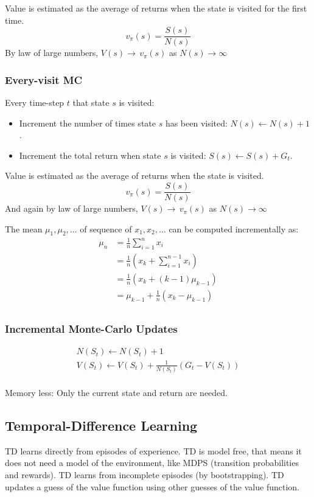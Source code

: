 Value is estimated as the average of returns when the state is visited for the first time.
\[
    v_{\pi}(s) = \frac{S(s)}{N(s)}
\]
By law of large numbers, $V(s)\rightarrow\,v_{\pi}(s)$ as $N(s)\rightarrow\infty$

\subsubsection{Every-visit MC}\label{subsubsec:every-visit-mc}
Every time-step $t$ that state $s$ is visited:
\begin{itemize}
    \item Increment the number of times state $s$ has
    been visited: $N(s) \leftarrow N(s) + 1$.
    \item Increment the total return when
    state $s$ is visited: $S(s) \leftarrow S(s) + G_t$.
\end{itemize}
Value is estimated as the average of returns when the state is visited.
\[
    v_{\pi}(s) = \frac{S(s)}{N(s)}
\]
And again by law of large numbers,
$V(s)\rightarrow\,v_{\pi}(s)$ as $N(s)\rightarrow\infty$

The mean $\mu_1, \mu_2, \ldots$ of sequence of $x_1, x_2, \ldots$ can be computed
incrementally as:
\begin{align}
    \mu_n &= \frac{1}{n}\sum_{i=1}^{n}x_i \\
    &= \frac{1}{n}\left(x_k + \sum_{i=1}^{n-1}x_i\right) \\
    &= \frac{1}{n}\left(x_k + (k-1)\mu_{k-1}\right) \\
    &= \mu_{k-1} + \frac{1}{n}\left(x_k-\mu_{k-1}\right) \\
\end{align}

\subsubsection{Incremental Monte-Carlo Updates}\label{subsubsec:incremental-monte-carlo-updates}
\begin{gather*}
    N(S_t) \leftarrow N(S_t) + 1\\
    V(S_t) \leftarrow V(S_t) + \frac{1}{N(S_t)}\left(G_t - V(S_t)\right)\\
\end{gather*}

Memory less: Only the current state and return are needed.

\subsection{Temporal-Difference Learning}\label{subsec:temporal-difference-learning}
TD learns directly from episodes of experience.
TD is model free, that means it does not need a model of the environment,
like MDPS (transition probabilities and rewards).
TD learns from incomplete episodes (by bootstrapping).
TD updates a guess of the value function using other guesses of the value function.

